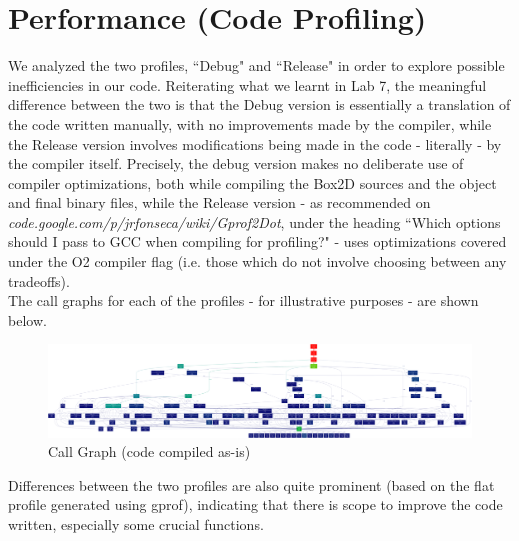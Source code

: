\documentclass [a4paper, 11pt] {article}
\begin{document}
\section {Performance (Code Profiling)}
We analyzed the two profiles, ``Debug" and ``Release" in order to explore possible inefficiencies in our code. Reiterating what we
learnt in Lab 7, the meaningful difference between the two is that the Debug version is essentially a translation of the code written
manually, with no improvements made by the compiler, while the Release version involves modifications being made in the code
- literally - by the compiler itself. Precisely, the debug version makes no deliberate use of compiler optimizations, both while compiling
the Box2D sources and the object and final binary files, while the Release version - as recommended on
\textit{code.google.com/p/jrfonseca/wiki/Gprof2Dot}, under the heading ``Which options should I pass to GCC when compiling for profiling?"
- uses optimizations covered under the O2 compiler flag (i.e. those which do not involve choosing between any tradeoffs).\\

\noindent{}The call graphs for each of the profiles - for illustrative purposes - are shown below.

\begin{figure}[htbp]
	\includegraphics[width=\linewidth]{doc/images/debug10K}
	\caption{Call Graph (code compiled as-is)}
\end{figure}

\noindent{}Differences between the two profiles are also quite prominent (based on the flat profile generated
using gprof), indicating that there is scope to improve the code written, especially some crucial functions.
\end{document}
